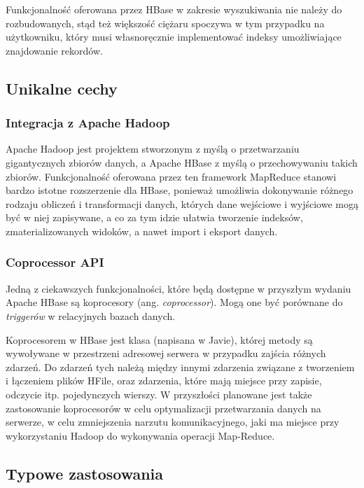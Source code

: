 Funkcjonalność oferowana przez HBase w zakresie wyszukiwania nie należy do rozbudowanych, stąd też większość ciężaru spoczywa w tym przypadku na użytkowniku, który musi własnoręcznie implementować indeksy umożliwiające znajdowanie rekordów.

\subsection*{Unikalne cechy}

\subsubsection*{Integracja z Apache Hadoop}

Apache Hadoop jest projektem stworzonym z myślą o przetwarzaniu gigantycznych zbiorów danych, a Apache HBase z myślą o przechowywaniu takich zbiorów.
Funkcjonalność oferowana przez ten framework MapReduce stanowi bardzo istotne rozszerzenie dla HBase, ponieważ umożliwia dokonywanie różnego rodzaju obliczeń i transformacji danych, których dane wejściowe i wyjściowe mogą być w niej zapisywane, a co za tym idzie ułatwia tworzenie indeksów, zmaterializowanych widoków, a nawet import i eksport danych.

\subsubsection*{Coprocessor API}

Jedną z ciekawszych funkcjonalności, które będą dostępne w przyszłym wydaniu Apache HBase są koprocesory (ang. \emph{coprocessor}).
Mogą one być porównane do \emph{triggerów} w relacyjnych bazach danych.

Koprocesorem w HBase jest klasa (napisana w Javie), której metody są wywoływane w przestrzeni adresowej serwera w przypadku zajścia różnych zdarzeń.
Do zdarzeń tych należą między innymi zdarzenia związane z tworzeniem i łączeniem plików HFile, oraz zdarzenia, które mają miejsce przy zapisie, odczycie itp. pojedynczych wierszy.
W przyszłości planowane jest także zastosowanie koprocesorów w celu optymalizacji przetwarzania danych na serwerze, w celu zmniejszenia narzutu komunikacyjnego, jaki ma miejsce przy wykorzystaniu Hadoop do wykonywania operacji Map-Reduce.

\subsection*{Typowe zastosowania}

